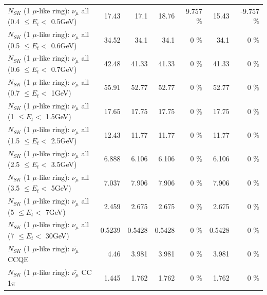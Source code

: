 \begin{table}
\begin{tabular}{| l | r | r | r  r | r  r |}
       $N_{SK}$ (1 $\mu$-like ring): $\nu_{\mu}$ all (0.4 $\leq E_{t} <$ 0.5GeV) &           17.43 &            17.1 &           18.76 &    9.757 \%  &           15.43 &   -9.757 \%  \\ 
       $N_{SK}$ (1 $\mu$-like ring): $\nu_{\mu}$ all (0.5 $\leq E_{t} <$ 0.6GeV) &           34.52 &            34.1 &            34.1 &        0 \%  &            34.1 &        0 \%  \\ 
       $N_{SK}$ (1 $\mu$-like ring): $\nu_{\mu}$ all (0.6 $\leq E_{t} <$ 0.7GeV) &           42.48 &           41.33 &           41.33 &        0 \%  &           41.33 &        0 \%  \\ 
         $N_{SK}$ (1 $\mu$-like ring): $\nu_{\mu}$ all (0.7 $\leq E_{t} <$ 1GeV) &           55.91 &           52.77 &           52.77 &        0 \%  &           52.77 &        0 \%  \\ 
         $N_{SK}$ (1 $\mu$-like ring): $\nu_{\mu}$ all (1 $\leq E_{t} <$ 1.5GeV) &           17.65 &           17.75 &           17.75 &        0 \%  &           17.75 &        0 \%  \\ 
       $N_{SK}$ (1 $\mu$-like ring): $\nu_{\mu}$ all (1.5 $\leq E_{t} <$ 2.5GeV) &           12.43 &           11.77 &           11.77 &        0 \%  &           11.77 &        0 \%  \\ 
       $N_{SK}$ (1 $\mu$-like ring): $\nu_{\mu}$ all (2.5 $\leq E_{t} <$ 3.5GeV) &           6.888 &           6.106 &           6.106 &        0 \%  &           6.106 &        0 \%  \\ 
         $N_{SK}$ (1 $\mu$-like ring): $\nu_{\mu}$ all (3.5 $\leq E_{t} <$ 5GeV) &           7.037 &           7.906 &           7.906 &        0 \%  &           7.906 &        0 \%  \\ 
           $N_{SK}$ (1 $\mu$-like ring): $\nu_{\mu}$ all (5 $\leq E_{t} <$ 7GeV) &           2.459 &           2.675 &           2.675 &        0 \%  &           2.675 &        0 \%  \\ 
          $N_{SK}$ (1 $\mu$-like ring): $\nu_{\mu}$ all (7 $\leq E_{t} <$ 30GeV) &          0.5239 &          0.5428 &          0.5428 &        0 \%  &          0.5428 &        0 \%  \\ 
\hline
\hline
\hline
                              $N_{SK}$ (1 $\mu$-like ring): $\bar{\nu_\mu}$ CCQE &            4.46 &           3.981 &           3.981 &        0 \%  &           3.981 &        0 \%  \\ 
                         $N_{SK}$ (1 $\mu$-like ring): $\bar{\nu_\mu}$ CC 1$\pi$ &           1.445 &           1.762 &           1.762 &        0 \%  &           1.762 &        0 \%  \\ 

\end{tabular}
\end{table}
